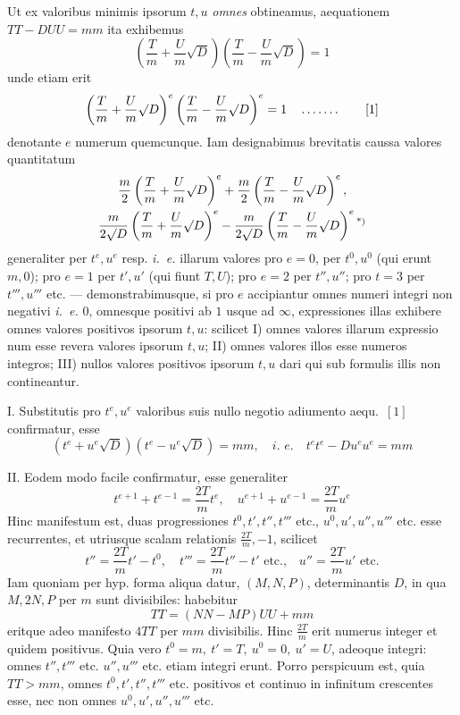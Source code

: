 Ut ex valoribus minimis ipsorum \(t,u\) \textit{omnes} obtineamus, aequationem \(TT-DUU=mm\) ita exhibemus
\[
\left(\frac{T}{m}+\frac{U}{m}\surd D\right)\left(\frac{T}{m}-\frac{U}{m}\surd D\right)=1
\]
unde etiam erit
\[
\left(\frac{T}{m}+\frac{U}{m}\surd D\right)^e\left(\frac{T}{m}-\frac{U}{m}\surd D\right)^e=1\quad\mathinner{\ldotp\ldotp\ldotp\ldotp\ldotp\ldotp\ldotp}\tag*{[1]}
\]
denotante \(e\) numerum quemcunque. Iam designabimus brevitatis caussa valores quantitatum
\begingroup{}
\[
\begin{gathered}\frac{m}{2}\left(\frac{T}{m}+\frac{U}{m}\surd D\right)^e+\frac{m}{2}\left(\frac{T}{m}-\frac{U}{m}\surd D\right)^e,\\
\frac{m}{2\surd D}\left(\frac{T}{m}+\frac{U}{m}\surd D\right)^e-\frac{m}{2\surd D}\left(\frac{T}{m}-\frac{U}{m}\surd D\right)^e\text{\textsuperscript{*)}}\end{gathered}
\]
\endgroup
generaliter per \(t^e,u^e\) resp. \textit{i.~e.} illarum valores pro \(e=0\), per \(t^0,u^0\) (qui erunt \(m,0\)); pro \(e=1\) per \(t',u'\) (qui fiunt \(T,U\)); pro \(e=2\) per \(t'',u''\); pro \(t=3\) per \(t''',u'''\) etc. --- demonstrabimusque, si pro \(e\) accipiantur omnes numeri integri non negativi \textit{i.~e.} \(0\), omnesque positivi ab \(1\) usque ad \(\infty\), expressiones illas exhibere omnes valores positivos ipsorum \(t,u\): scilicet I) omnes valores illarum expressio%
%
num esse revera valores ipsorum \(t,u\); II) omnes valores illos esse numeros integros; III) nullos valores positivos ipsorum \(t,u\) dari qui sub formulis illis non contineantur.

I. Substitutis pro \(t^e,u^e\) valoribus suis nullo negotio adiumento aequ.~\([1]\) confirmatur, esse
\[
(t^e+u^e\surd D)(t^e-u^e\surd D)=mm,\quad \textit{i.~e.}\quad t^e t^e-Du^e u^e=mm
\]

II. Eodem modo facile confirmatur, esse generaliter
\[
t^{e+1}+t^{e-1}=\frac{2T}{m}t^e,\quad u^{e+1}+u^{e-1}=\frac{2T}{m}u^e
\]
Hinc manifestum est, duas progressiones \(t^0,t',t'',t'''\) etc., \(u^0,u',u'',u'''\) etc. esse recurrentes, et utriusque scalam relationis \(\frac{2T}{m},-1\), scilicet
\[
t''=\frac{2T}{m}t'-t^0,\quad t'''=\frac{2T}{m}t''-t'\text{ etc.,}\quad u''=\frac{2T}{m}u'\text{ etc.}
\]
Iam quoniam per hyp. forma aliqua datur, \((M,N,P)\), determinantis \(D\), in qua \(M,2N,P\) per \(m\) sunt divisibiles: habebitur
\[
TT=(NN-MP)UU+mm
\]
eritque adeo manifesto \(4TT\) per \(mm\) divisibilis. Hinc \(\frac{2T}{m}\) erit numerus integer et quidem positivus. Quia vero \(t^0=m,\ t'=T,\ u^0=0,\ u'=U\), adeoque integri: omnes \(t'',t'''\) etc. \(u'',u'''\) etc. etiam integri erunt. Porro perspicuum est, quia \(TT>mm\), omnes \(t^0,t',t'',t'''\) etc. positivos et continuo in infinitum crescentes esse, nec non omnes \(u^0,u',u'',u'''\) etc.

